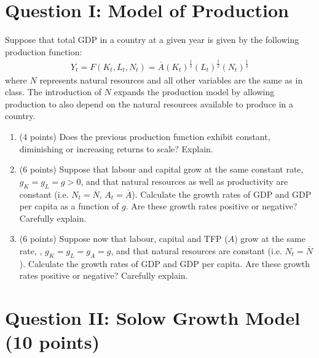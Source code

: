\documentclass[letterpaper,12pt]{article}
\theoremstyle{dotlessS}
\begin{document}
\section*{Question I: Model of Production}
Suppose that total GDP in a country at a given year is given by the following production function:
\begin{eqnarray*}
Y_t=F(K_t, L_t, N_t)=\overline{A}(K_t)^{\frac{1}{4}}(L_t)^{\frac{1}{2}}(N_t)^{\frac{1}{4}} 
\end{eqnarray*}
where $N$ represents natural resources and all other variables are the same as in class. The introduction of $N$ expands the production model by allowing production to also depend on the natural resources available to produce in a country. 
\begin{enumerate}[label=(\alph*)]
\item (4 points) Does the previous production function exhibit constant, diminishing or increasing returns to scale? Explain.
\item (6 points) Suppose that labour and capital grow at the same constant rate, $g_K=g_L=g>0$, and that natural resources as well as productivity  are constant (i.e. $N_t=\overline{N}$, $A_t=\overline{A}$). Calculate the growth rates of GDP and GDP per capita as a function of $g$. Are these growth rates positive or negative? Carefully explain.
\item (6 points) Suppose now that labour, capital and TFP ($A$) grow at the same rate, , $g_K=g_L=g_A=g$, and that natural resources are constant (i.e. $N_t=\overline{N}$). Calculate the growth rates of GDP and GDP per capita. Are these growth rates positive or negative? Carefully explain. 
\end{enumerate}


\section*{Question II: Solow Growth Model (10 points)}
\end{document}
